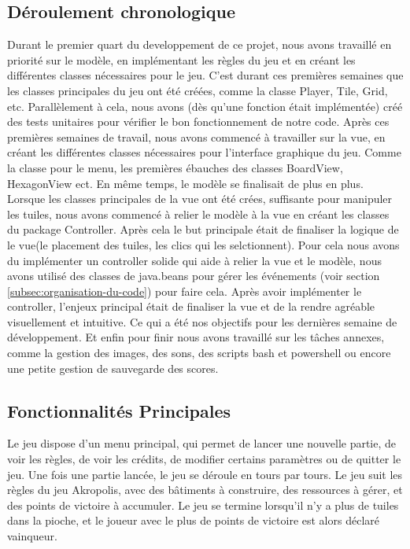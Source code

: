 \documentclass{article}
\begin{document}
    \subsection{Déroulement chronologique}\label{subsec:deroulement-chronologique}

    Durant le premier quart du developpement de ce projet, nous avons travaillé en priorité sur le modèle, en implémentant les règles du jeu et en créant les différentes classes nécessaires pour le jeu.
    C'est durant ces premières semaines que les classes principales du jeu ont été créées, comme la classe Player, Tile, Grid, etc.
    Parallèlement à cela, nous avons (dès qu'une fonction était implémentée) créé des tests unitaires pour vérifier le bon fonctionnement de notre code.
    Après ces premières semaines de travail, nous avons commencé à travailler sur la vue, en créant les différentes classes nécessaires pour l'interface graphique du jeu.
    Comme la classe pour le menu, les premières ébauches des classes BoardView, HexagonView ect.
    En même temps, le modèle se finalisait de plus en plus.
    Lorsque les classes principales de la vue ont été crées, suffisante pour manipuler les tuiles, nous avons commencé à relier le modèle à la vue en créant les classes du package Controller.
    Après cela le but principale était de finaliser la logique de le vue(le placement des tuiles, les clics qui les selctionnent).
    Pour cela nous avons du implémenter un controller solide qui aide à relier la vue et le modèle, nous avons utilisé des classes de java.beans pour gérer les événements (voir section \ref{subsec:organisation-du-code}) pour faire cela.
    Après avoir implémenter le controller, l'enjeux principal était de finaliser la vue et de la rendre agréable visuellement et intuitive.
    Ce qui a été nos objectifs pour les dernières semaine de développement.
    Et enfin pour finir nous avons travaillé sur les tâches annexes, comme la gestion des images, des sons, des scripts bash et powershell ou encore une petite gestion de sauvegarde des scores.

    \subsection{Fonctionnalités Principales}\label{subsec:fonctionnalites-principales}

    Le jeu dispose d'un menu principal, qui permet de lancer une nouvelle partie, de voir les règles, de voir les crédits, de modifier certains paramètres ou de quitter le jeu.
    Une fois une partie lancée, le jeu se déroule en tours par tours.
    Le jeu suit les règles du jeu Akropolis, avec des bâtiments à construire, des ressources à gérer, et des points de victoire à accumuler.
    Le jeu se termine lorsqu'il n'y a plus de tuiles dans la pioche, et le joueur avec le plus de points de victoire est alors déclaré vainqueur.
\end{document}
